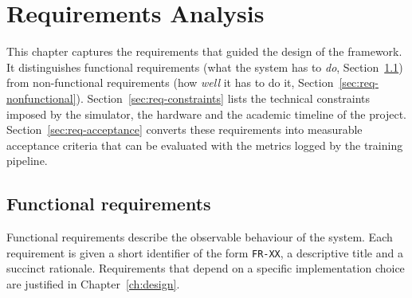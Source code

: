 
\chapter{Requirements Analysis}\label{ch:requirements}

This chapter captures the requirements that guided the design of the framework. It distinguishes
functional requirements (what the system has to \emph{do}, Section~\ref{sec:req-functional}) from
non-functional requirements (how \emph{well} it has to do it, Section~\ref{sec:req-nonfunctional}).
Section~\ref{sec:req-constraints} lists the technical constraints imposed by the simulator, the
hardware and the academic timeline of the project. Section~\ref{sec:req-acceptance} converts
these requirements into measurable acceptance criteria that can be evaluated with the metrics
logged by the training pipeline.

\section{Functional requirements}\label{sec:req-functional}

Functional requirements describe the observable behaviour of the system. Each requirement is
given a short identifier of the form \texttt{FR-XX}, a descriptive title and a succinct
rationale. Requirements that depend on a specific implementation choice are justified in
Chapter~\ref{ch:design}.

